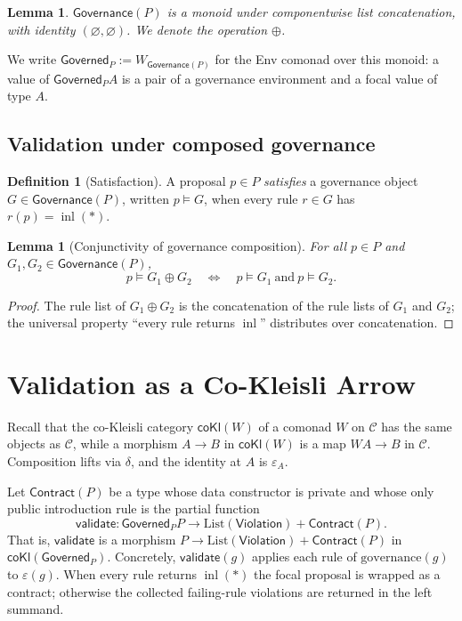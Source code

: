 \documentclass[journal,10pt]{IEEEtran}
\theoremstyle{plain}
\newtheorem{lemma}[theorem]{Lemma}
\theoremstyle{definition}
\newtheorem{definition}[theorem]{Definition}
\theoremstyle{remark}
\newcommand{\CoKl}{\mathsf{coKl}}
\DeclareMathOperator{\inl}{inl}
\newcommand{\Governed}{\mathsf{Governed}}
\newcommand{\Governance}{\mathsf{Governance}}
\newcommand{\Contract}{\mathsf{Contract}}
\newcommand{\Violation}{\mathsf{Violation}}
\newcommand{\Validate}{\mathsf{validate}}
\begin{document}
\begin{lemma}\label{lem:governance-monoid}
$\Governance(P)$ is a monoid under componentwise list concatenation,
with identity $(\varnothing, \varnothing)$. We denote the operation
$\oplus$.
\end{lemma}

We write $\Governed_P := W_{\Governance(P)}$ for the Env comonad over
this monoid: a value of $\Governed_P A$ is a pair of a governance
environment and a focal value of type $A$.

\subsection{Validation under composed governance}

\begin{definition}[Satisfaction]\label{def:satisfaction}
A proposal $p \in P$ \emph{satisfies} a governance object
$G \in \Governance(P)$, written $p \models G$, when every rule
$r \in G$ has $r(p) = \inl(*)$.
\end{definition}

\begin{lemma}[Conjunctivity of governance composition]
\label{lem:conjunctive}
For all $p \in P$ and $G_1, G_2 \in \Governance(P)$,
\[
p \models G_1 \oplus G_2
\quad\Longleftrightarrow\quad
p \models G_1 \ \text{and}\ p \models G_2.
\]
\end{lemma}

\begin{proof}
The rule list of $G_1 \oplus G_2$ is the concatenation of the rule
lists of $G_1$ and $G_2$; the universal property ``every rule
returns $\inl$'' distributes over concatenation.
\end{proof}

\section{Validation as a Co-Kleisli Arrow}
\label{sec:validation}

Recall that the co-Kleisli category $\CoKl(W)$ of a comonad $W$ on
$\mathcal{C}$ has the same objects as $\mathcal{C}$, while a morphism
$A \to B$ in $\CoKl(W)$ is a map $W A \to B$ in $\mathcal{C}$.
Composition lifts via $\delta$, and the identity at $A$ is
$\varepsilon_A$.

Let $\Contract(P)$ be a type whose data constructor is private and
whose only public introduction rule is the partial function
\begin{equation}
\label{eq:validate}
\Validate \colon \Governed_P P
   \longrightarrow \mathrm{List}(\Violation) + \Contract(P).
\end{equation}
That is, $\Validate$ is a morphism
$P \to \mathrm{List}(\Violation) + \Contract(P)$ in
$\CoKl(\Governed_P)$. Concretely, $\Validate(g)$ applies each rule of
$\mathrm{governance}(g)$ to $\varepsilon(g)$. When every rule returns
$\inl(*)$ the focal proposal is wrapped as a contract; otherwise the
collected failing-rule violations are returned in the left summand.
\end{document}
